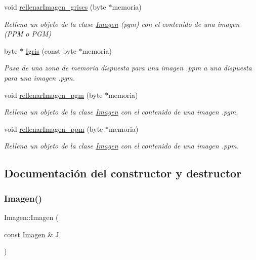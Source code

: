 \begin{DoxyCompactItemize}
void \hyperlink{classImagen_a9a3870103cebf6da0f9771628c182ccf}{rellenar\+Imagen\+\_\+grises} (byte $\ast$memoria)
\begin{DoxyCompactList}\small\item\em Rellena un objeto de la clase \hyperlink{classImagen}{Imagen} (pgm) con el contenido de una imagen (P\+PM o P\+GM) \end{DoxyCompactList}\item 
byte $\ast$ \hyperlink{classImagen_a77d5744cb232e2de19e3941eae893961}{Igris} (const byte $\ast$memoria)
\begin{DoxyCompactList}\small\item\em Pasa de una zona de memoria dispuesta para una imagen .ppm a una dispuesta para una imagen .pgm. \end{DoxyCompactList}\item 
void \hyperlink{classImagen_a361eeffdebd18fa24810cb8e058287ca}{rellenar\+Imagen\+\_\+pgm} (byte $\ast$memoria)
\begin{DoxyCompactList}\small\item\em Rellena un objeto de la clase \hyperlink{classImagen}{Imagen} con el contenido de una imagen .pgm. \end{DoxyCompactList}\item 
void \hyperlink{classImagen_ae16cd735c83eb3d3bcb125affa8e0c99}{rellenar\+Imagen\+\_\+ppm} (byte $\ast$memoria)
\begin{DoxyCompactList}\small\item\em Rellena un objeto de la clase \hyperlink{classImagen}{Imagen} con el contenido de una imagen .ppm. \end{DoxyCompactList}\end{DoxyCompactItemize}


\subsection{Documentación del constructor y destructor}
\mbox{\label{classImagen_a70437d2848ae5b030ee17cf79651a8b5}} 
\subsubsection{\texorpdfstring{Imagen()}{Imagen()}\hspace{0.1cm}{\footnotesize\ttfamily [1/3]}}
{\footnotesize\ttfamily Imagen\+::\+Imagen (\begin{DoxyParamCaption}\item[{const \hyperlink{classImagen}{Imagen} \&}]{J }\end{DoxyParamCaption})}



